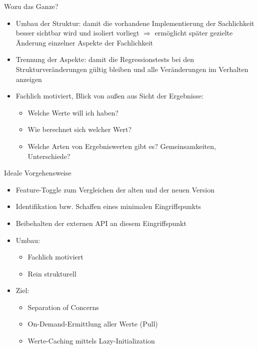\begin{frame}[t,fragile]{Wozu das Ganze?}
\begin{itemize}
\item Umbau der Struktur: damit die vorhandene Implementierung der Sachlichkeit besser sichtbar wird und isoliert vorliegt
$\Rightarrow$ ermöglicht später gezielte Änderung einzelner Aspekte der Fachlichkeit
\item Trennung der Aspekte: damit die Regressionstests bei den Strukturveränderungen gültig bleiben und alle Veränderungen im Verhalten anzeigen
\item Fachlich motiviert, Blick von außen aus Sicht der Ergebnisse:
\begin{itemize}
\item Welche Werte will ich haben?
\item Wie berechnet sich welcher Wert?
\item Welche Arten von Ergebniswerten gibt es? Gemeinsamkeiten, Unterschiede?
\end{itemize}
\end{itemize}
\end{frame}


\begin{frame}[t,fragile]{Ideale Vorgehensweise}
\begin{itemize}
\item Feature-Toggle zum Vergleichen der alten und der neuen Version
\item Identifikation bzw. Schaffen eines minimalen Eingriffspunkts
\item Beibehalten der externen API an diesem Eingriffspunkt

\item Umbau:
\begin{itemize}
\item Fachlich motiviert
\item Rein strukturell
\end{itemize}

\item Ziel:
\begin{itemize}
\item Separation of Concerns
\item On-Demand-Ermittlung aller Werte (\glqq Pull\grqq{})
\item Werte-Caching mittels Lazy-Initialization
\end{itemize}

\end{itemize}
\end{frame}




